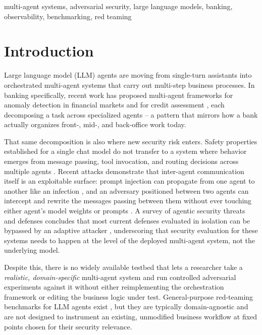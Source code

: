 \documentclass[conference]{IEEEtran}
\begin{document}
\begin{IEEEkeywords}
multi-agent systems, adversarial security, large language models, banking, observability, benchmarking, red teaming
\end{IEEEkeywords}

\section{Introduction}

Large language model (LLM) agents are moving from single-turn assistants into orchestrated multi-agent systems that carry out multi-step business processes. In banking specifically, recent work has proposed multi-agent frameworks for anomaly detection in financial markets \cite{anomaly_detection_finance} and for credit assessment \cite{masca_credit}, each decomposing a task across specialized agents -- a pattern that mirrors how a bank actually organizes front-, mid-, and back-office work today.

That same decomposition is also where new security risk enters. Safety properties established for a single chat model do not transfer to a system where behavior emerges from message passing, tool invocation, and routing decisions across multiple agents \cite{agentic_security_survey}. Recent attacks demonstrate that inter-agent communication itself is an exploitable surface: prompt injection can propagate from one agent to another like an infection \cite{prompt_infection}, and an adversary positioned between two agents can intercept and rewrite the messages passing between them without ever touching either agent's model weights or prompts \cite{aitm_communication_attacks}. A survey of agentic security threats and defenses concludes that most current defenses evaluated in isolation can be bypassed by an adaptive attacker \cite{agentic_security_survey}, underscoring that security evaluation for these systems needs to happen at the level of the deployed multi-agent system, not the underlying model.

Despite this, there is no widely available testbed that lets a researcher take a \emph{realistic, domain-specific} multi-agent system and run controlled adversarial experiments against it without either reimplementing the orchestration framework or editing the business logic under test. General-purpose red-teaming benchmarks for LLM agents exist \cite{redagentbench}, but they are typically domain-agnostic and are not designed to instrument an existing, unmodified business workflow at fixed points chosen for their security relevance.
\end{document}
